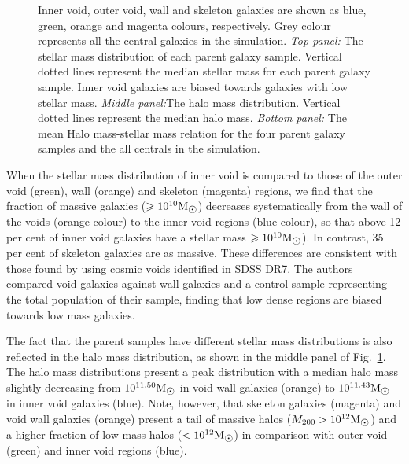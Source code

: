 \documentclass[a4paper,fleqn,usenatbib,letter]{mnras}
\newcommand{\Msun}{\rm M_{\sun}}
\begin{document}
\begin{figure}
\begin{tabular}{c}
	\end{tabular}	
    \caption{ Inner void, outer void, wall and skeleton galaxies are shown as blue, green, orange and magenta colours, respectively. Grey colour represents all the central galaxies in the simulation. \textit{Top panel:} The stellar mass distribution of each parent galaxy sample. Vertical dotted lines represent the median stellar mass for each parent galaxy sample. Inner void galaxies are biased towards galaxies with low stellar mass.  \textit{Middle panel:}The halo mass distribution. Vertical dotted lines represent the median halo mass.  \textit{Bottom panel:} The mean Halo mass-stellar mass relation for the four parent galaxy samples and the all centrals in the simulation.}
    \label{fig:gmf}
\end{figure}




When the stellar mass distribution of inner void is compared to those of the outer void (green), wall (orange) and skeleton (magenta) regions, we find  that the fraction of massive galaxies ($\geq 10^{10}\Msun$) decreases systematically from the wall of the voids (orange colour) to the inner void regions (blue colour), so that above 12 per cent  of inner void galaxies  have  a stellar mass $\geq 10^{10}\Msun$). In contrast, 35 per cent of skeleton galaxies are as massive. These differences are consistent with those found by  \citet{ricciardelli2014} using cosmic voids identified in SDSS DR7. The authors compared void galaxies against wall galaxies and a control sample representing the total population of their sample, finding that low dense regions are biased towards low mass galaxies. 

The fact that the parent samples  have different stellar mass distributions is also reflected in the halo mass distribution, as shown in the middle  panel of Fig.~\ref{fig:gmf}. The halo mass distributions present a  peak distribution with a median halo mass slightly decreasing from $10^{11.50}\Msun$ in void wall  galaxies (orange)  to $10^{11.43}\Msun$ in inner void galaxies (blue). Note, however, that skeleton  galaxies (magenta) and void wall galaxies (orange) present a tail of massive halos ($M_{200}>10^{12}\Msun$) and a higher fraction of low mass halos ($<10^{12}\Msun$) in comparison with outer void (green) and inner void regions (blue).     
\end{document}
